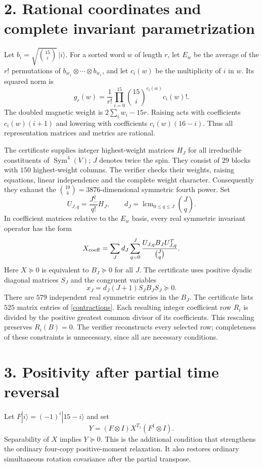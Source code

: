 \documentclass[11pt]{article}
\begin{document}
\section*{2. Rational coordinates and complete invariant parametrization}
Let $b_i=\sqrt{\binom{15}{i}}\,|i\rangle$.
For a sorted word $w$ of length $r$, let $E_w$ be the average of the $r!$
permutations of $b_{w_1}\otimes\cdots\otimes b_{w_r}$, and let $c_i(w)$
be the multiplicity of $i$ in $w$. Its squared norm is
\[
 g_r(w)=\frac1{r!}\prod_{i=0}^{15}
          \binom{15}{i}^{c_i(w)}c_i(w)!.
\]
The doubled magnetic weight is $2\sum_iw_i-15r$.
Raising acts with coefficients $c_i(w)(i+1)$ and lowering with coefficients
$c_i(w)(16-i)$. Thus all representation matrices and metrics are rational.

The certificate supplies integer highest-weight matrices $H_J$ for all
irreducible constituents of $\operatorname{Sym}^{4}(V)$; $J$ denotes twice
the spin. They consist of $29$ blocks with $150$ highest-weight columns.
The verifier checks their weights, raising equations, linear independence
and the complete weight character. Consequently they exhaust the
$\binom{19}{4}=3876$-dimensional symmetric fourth power.
Set
\[
 U_{J,q}=\frac{J_-^{q}}{q!}H_J,\qquad
 d_J=\operatorname{lcm}_{0\leq q\leq J}\binom Jq.
\]
In coefficient matrices relative to the $E_w$ basis, every real symmetric
invariant operator has the form
\begin{equation}\label{decomposition}
 X_{\rm coeff}=\sum_J d_J\sum_{q=0}^{J}
 \frac{U_{J,q}B_JU_{J,q}^{T}}{\binom Jq}.
\end{equation}
Here $X\succeq0$ is equivalent to $B_J\succeq0$ for all $J$.
The certificate uses positive dyadic diagonal matrices $S_J$ and the
congruent variables
\[
 x_J=d_J(J+1)S_JB_JS_J\succeq0.
\]
There are $579$ independent real symmetric entries in the $B_J$.
The certificate lists $525$ matrix entries of \eqref{contractions}.
Each resulting integer coefficient row $R_i$ is divided by the positive
greatest common divisor of its coefficients. This rescaling preserves
$R_i(B)=0$. The verifier reconstructs every selected row; completeness of
these constraints is unnecessary, since all are necessary conditions.

\section*{3. Positivity after partial time reversal}
Let $F|i\rangle=(-1)^i|15-i\rangle$ and set
\[
 Y=(F\otimes I)X^{T_1}(F^\dagger\otimes I).
\]
Separability of $X$ implies $Y\succeq0$. This is the additional condition
that strengthens the ordinary four-copy positive-moment relaxation.
It also restores ordinary simultaneous rotation covariance after the
partial transpose.
\end{document}
